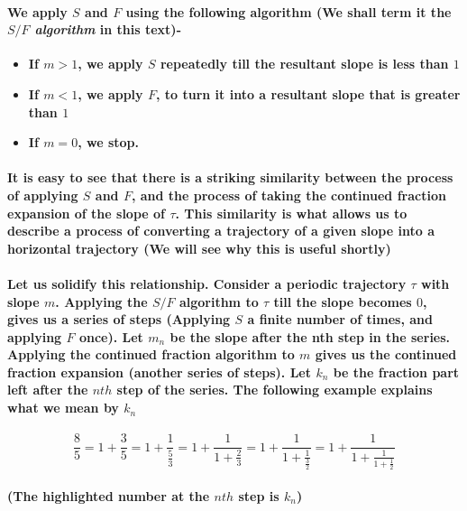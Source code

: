 \documentclass{report}
\begin{document}
\paragraph{We apply $S$ and $F$ using the following algorithm (We shall term it the \textit{$S/F$ algorithm} in this text)-}

\begin{itemize}
\item \textbf{If $m>1$, we apply $S$ repeatedly till the resultant slope is less than $1$}

\item \textbf{If $m<1$, we apply $F$, to turn it into a resultant slope that is greater than $1$}

\item \textbf{If $m=0$, we stop.}
\end{itemize}

\paragraph{It is easy to see that there is a striking similarity between the process of applying $S$ and $F$, and the process of taking the continued fraction expansion of the slope of $\tau$. This similarity is what allows us to describe a process of converting a trajectory of a given slope into a horizontal trajectory (We will see why this is useful shortly)}

\paragraph{Let us solidify this relationship. Consider a periodic trajectory $\tau$  with slope $m$. Applying the $S/F$ algorithm to $\tau$ till the slope becomes $0$, gives us a series of steps (Applying $S$ a finite number of times, and applying $F$ once). Let $m_n$ be the slope after the nth step in the series. Applying the continued fraction algorithm to $m$ gives us the continued fraction expansion (another series of steps). Let $k_n$ be the fraction part left after the $nth$ step of the series. The following example explains what we mean by $k_n$ }

\begin{equation}
\frac{8}{5}=1+\frac{3}{5}=1+\frac{1}{\frac{5}{3}}=1+\frac{1}{1+\frac{2}{3}}=1+\frac{1}{1+\frac{1}{\frac{3}{2}}}=1+\frac{1}{1+\frac{1}{1+\frac{1}{2}}}
\end{equation}

\paragraph{(The highlighted number at the $nth$ step is $k_n$)}
\end{document}
